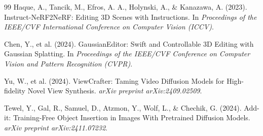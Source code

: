 \documentclass[pdflatex,sn-mathphys-num]{sn-jnl}%
\theoremstyle{thmstyleone}%
\theoremstyle{thmstyletwo}%
\theoremstyle{thmstylethree}%
\begin{document}
\begin{thebibliography}{99}
Haque, A., Tancik, M., Efros, A. A., Holynski, A., \& Kanazawa, A. (2023). Instruct-NeRF2NeRF: Editing 3D Scenes with Instructions. In \textit{Proceedings of the IEEE/CVF International Conference on Computer Vision (ICCV)}.

Chen, Y., et al. (2024). GaussianEditor: Swift and Controllable 3D Editing with Gaussian Splatting. In \textit{Proceedings of the IEEE/CVF Conference on Computer Vision and Pattern Recognition (CVPR)}.

Yu, W., et al. (2024). ViewCrafter: Taming Video Diffusion Models for High-fidelity Novel View Synthesis. \textit{arXiv preprint arXiv:2409.02509}.

Tewel, Y., Gal, R., Samuel, D., Atzmon, Y., Wolf, L., \& Chechik, G. (2024). Add-it: Training-Free Object Insertion in Images With Pretrained Diffusion Models. \textit{arXiv preprint arXiv:2411.07232}.

\end{thebibliography}






\end{document}
